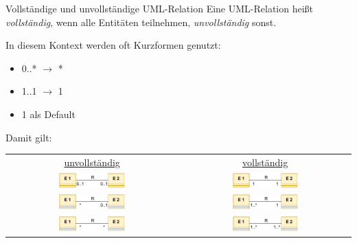 \begin{defi}{Vollständige und unvollständige UML-Relation}
    Eine UML-Relation heißt \emph{vollständig}, wenn alle Entitäten teilnehmen, \emph{unvollständig} sonst.

    In diesem Kontext werden oft Kurzformen genutzt:
    \begin{itemize}
        \item 0..* $\to$ *
        \item 1..1 $\to$ 1
        \item 1 als Default
    \end{itemize}

    Damit gilt:
    \begin{center}
        \begin{tabular}{cc}
            \underline{unvollständig}                                                                                   & \underline{vollständig}                                                                                   \\
            \includegraphics[width=0.4\textwidth]{includes/figures/definition_incomplete_uml_relation_one_to_one.pdf}   & \includegraphics[width=0.4\textwidth]{includes/figures/definition_complete_uml_relation_one_to_one.pdf}   \\
            \includegraphics[width=0.4\textwidth]{includes/figures/definition_incomplete_uml_relation_many_to_one.pdf}  & \includegraphics[width=0.4\textwidth]{includes/figures/definition_complete_uml_relation_many_to_one.pdf}  \\
            \includegraphics[width=0.4\textwidth]{includes/figures/definition_incomplete_uml_relation_many_to_many.pdf} & \includegraphics[width=0.4\textwidth]{includes/figures/definition_complete_uml_relation_many_to_many.pdf} \\
        \end{tabular}
    \end{center}
\end{defi}

